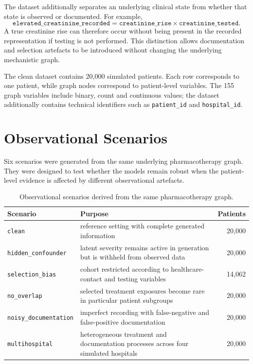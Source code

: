 The dataset additionally separates an underlying clinical state from whether that state is observed or documented.
For example,
\begin{equation}
\texttt{elevated\_creatinine\_recorded}
=
\texttt{creatinine\_rise}
\times
\texttt{creatinine\_tested}.
\end{equation}
A true creatinine rise can therefore occur without being present in the recorded representation if testing is not performed.
This distinction allows documentation and selection artefacts to be introduced without changing the underlying mechanistic graph.

The clean dataset contains 20{,}000 simulated patients.
Each row corresponds to one patient, while graph nodes correspond to patient-level variables.
The 155 graph variables include binary, count and continuous values; the dataset additionally contains technical identifiers such as \texttt{patient\_id} and \texttt{hospital\_id}.

\section{Observational Scenarios}

Six scenarios were generated from the same underlying pharmacotherapy graph.
They were designed to test whether the models remain robust when the patient-level evidence is affected by different observational artefacts.

\begin{table}[ht]
\centering
\caption{Observational scenarios derived from the same pharmacotherapy graph.}
\label{tab:dataset-scenarios}
\begin{tabularx}{\textwidth}{@{}lXr@{}}
\toprule
Scenario & Purpose & Patients \\
\midrule
\texttt{clean} & reference setting with complete generated information & 20{,}000 \\
\texttt{hidden\_confounder} & latent severity remains active in generation but is withheld from observed data & 20{,}000 \\
\texttt{selection\_bias} & cohort restricted according to healthcare-contact and testing variables & 14{,}062 \\
\texttt{no\_overlap} & selected treatment exposures become rare in particular patient subgroups & 20{,}000 \\
\texttt{noisy\_documentation} & imperfect recording with false-negative and false-positive documentation & 20{,}000 \\
\texttt{multihospital} & heterogeneous treatment and documentation processes across four simulated hospitals & 20{,}000 \\
\bottomrule
\end{tabularx}
\end{table}

